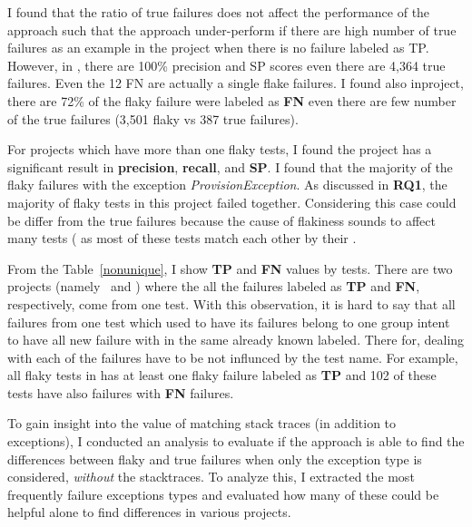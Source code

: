 I found that the ratio of true failures does not affect the performance of the approach such that the approach under-perform if there are high number of true failures as an example in the project \http when there is no failure labeled as TP. However, in \wildfly, there are 100\% precision and SP scores even there are 4,364 true failures. Even the 12 FN are actually a single flake failures. I found also in\http project, there are 72\% of the flaky failure were labeled as \textbf{FN} even there are few number of the true failures (3,501 flaky vs 387 true failures). 


For projects which have more than one flaky tests, I found the project \ambari has a significant result in \textbf{precision}, \textbf{recall}, and \textbf{SP}. I found that the majority of the flaky failures with the exception \emph{ProvisionException}. As discussed in \textbf{RQ1}, the majority of flaky tests in this project failed together. Considering this case could be differ from the true failures because the cause of flakiness sounds to affect many tests ( as most of these tests match each other by their \failures. 


From the Table~\ref{nonunique}, I show \textbf{TP} and \textbf{FN} values by tests. There are two projects (namely \activiti~and \hector) where the all the failures labeled as \textbf{TP} and \textbf{FN}, respectively, come from one test. With this observation, it is hard to say that all failures from one test which used to have its failures belong to one group intent to have all new failure with in the same already known labeled. There for, dealing with each of the failures have to be not influnced by the test name. For example, all flaky tests in \alluxio has at least one flaky failure labeled as \textbf{TP} and 102 of these tests have also failures with \textbf{FN} failures. 


To gain insight into the value of matching stack traces (in addition to exceptions), I conducted an analysis to evaluate if the \syntax approach is able to find the differences between flaky and true failures when only the exception type is considered, \emph{without} the stacktraces. To analyze this, I extracted the most frequently failure exceptions types and evaluated how many of these could be helpful alone to find differences in various projects.

